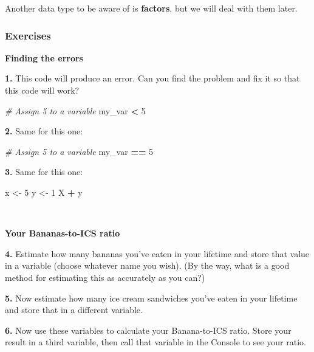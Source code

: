 \documentclass[
]{book}
\newenvironment{Shaded}{\begin{snugshade}}{\end{snugshade}}
\newcommand{\CommentTok}[1]{\textcolor[rgb]{0.56,0.35,0.01}{\textit{#1}}}
\newcommand{\DecValTok}[1]{\textcolor[rgb]{0.00,0.00,0.81}{#1}}
\newcommand{\NormalTok}[1]{#1}
\newcommand{\OtherTok}[1]{\textcolor[rgb]{0.56,0.35,0.01}{#1}}
\newcommand{\SpecialCharTok}[1]{\textcolor[rgb]{0.81,0.36,0.00}{\textbf{#1}}}
\begin{document}
Another data type to be aware of is \textbf{factors}, but we will deal with them later.

\subsubsection*{Exercises}\label{exercises-2}

\textbf{Finding the errors}

\textbf{1.} This code will produce an error. Can you find the problem and fix it so that this code will work?

\begin{Shaded}
\begin{Highlighting}[]
\CommentTok{\# Assign 5 to a variable}
\NormalTok{my\_var }\SpecialCharTok{\textless{}} \DecValTok{5}
\end{Highlighting}
\end{Shaded}

\textbf{2.} Same for this one:

\begin{Shaded}
\begin{Highlighting}[]
\CommentTok{\# Assign 5 to a variable}
\NormalTok{my\_var }\SpecialCharTok{==} \DecValTok{5}
\end{Highlighting}
\end{Shaded}

\textbf{3.} Same for this one:

\begin{Shaded}
\begin{Highlighting}[]
\NormalTok{x }\OtherTok{\textless{}{-}} \DecValTok{5}
\NormalTok{y }\OtherTok{\textless{}{-}} \DecValTok{1}
\NormalTok{X }\SpecialCharTok{+}\NormalTok{ y}
\end{Highlighting}
\end{Shaded}

~

\textbf{Your Bananas-to-ICS ratio}

\textbf{4.} Estimate how many bananas you've eaten in your lifetime and store that value in a variable (choose whatever name you wish). (By the way, what is a good method for estimating this as accurately as you can?)

\textbf{5.} Now estimate how many ice cream sandwiches you've eaten in your lifetime and store that in a different variable.

\textbf{6.} Now use these variables to calculate your Banana-to-ICS ratio. Store your result in a third variable, then call that variable in the Console to see your ratio.
\end{document}
